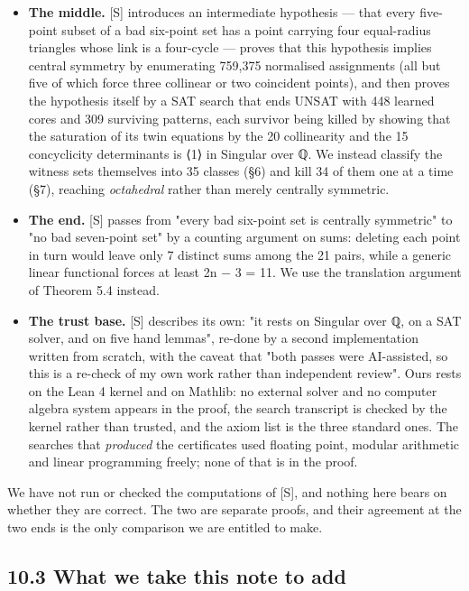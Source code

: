 \documentclass[11pt,a4paper]{article}
\theoremstyle{named}
\begin{document}
\begin{itemize}[leftmargin=1.4em,itemsep=.2em,topsep=.3em]
\item \textbf{The middle.} [S] introduces an intermediate hypothesis — that every five-point subset of a bad six-point set has a point carrying four equal-radius triangles whose link is a four-cycle — proves that this hypothesis implies central symmetry by enumerating 759,375 normalised assignments (all but five of which force three collinear or two coincident points), and then proves the hypothesis itself by a SAT search that ends UNSAT with 448 learned cores and 309 surviving patterns, each survivor being killed by showing that the saturation of its twin equations by the 20 collinearity and the 15 concyclicity determinants is ⟨1⟩ in Singular over ℚ. We instead classify the witness sets themselves into 35 classes (§6) and kill 34 of them one at a time (§7), reaching \textit{octahedral} rather than merely centrally symmetric.
\item \textbf{The end.} [S] passes from "every bad six-point set is centrally symmetric" to "no bad seven-point set" by a counting argument on sums: deleting each point in turn would leave only 7 distinct sums among the 21 pairs, while a generic linear functional forces at least 2n − 3 = 11. We use the translation argument of Theorem 5.4 instead.
\item \textbf{The trust base.} [S] describes its own: "it rests on Singular over ℚ, on a SAT solver, and on five hand lemmas", re-done by a second implementation written from scratch, with the caveat that "both passes were AI-assisted, so this is a re-check of my own work rather than independent review". Ours rests on the Lean 4 kernel and on Mathlib: no external solver and no computer algebra system appears in the proof, the search transcript is checked by the kernel rather than trusted, and the axiom list is the three standard ones. The searches that \textit{produced} the certificates used floating point, modular arithmetic and linear programming freely; none of that is in the proof.
\end{itemize}

We have not run or checked the computations of [S], and nothing here bears on whether they are correct. The two are separate proofs, and their agreement at the two ends is the only comparison we are entitled to make.

\subsection*{10.3 What we take this note to add}
\end{document}
